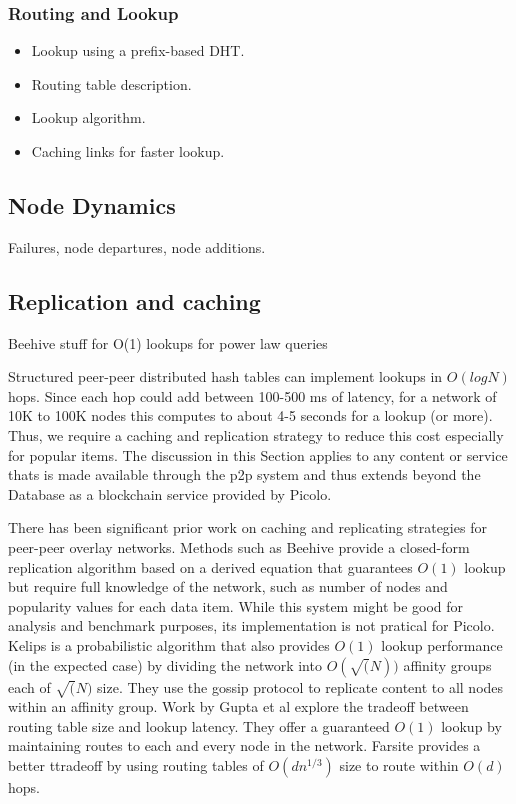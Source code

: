 \subsubsection{Routing and Lookup}

\begin{itemize}
    \item Lookup using a prefix-based DHT. 
    \item Routing table description.
    \item Lookup algorithm.
    \item Caching links for faster lookup. 
\end{itemize}

\subsection{Node Dynamics}

Failures, node departures, node additions.

\subsection{Replication and caching}
Beehive stuff for O(1) lookups for power law queries

Structured peer-peer distributed hash tables can implement lookups in \( O(log N)\) hops. Since each hop could add between 100-500
ms of latency, for a network of 10K to 100K nodes this computes to about 4-5 seconds for a lookup (or more). Thus, we
require a caching and replication strategy to reduce this cost especially for popular items. The discussion in this
Section applies to any content or service thats is made available through the p2p system and thus extends beyond the
Database as a blockchain service provided by Picolo.

There has been significant prior work on caching and replicating strategies for peer-peer overlay networks. Methods such
as Beehive \cite{beehive} provide a closed-form replication algorithm based on a derived equation that guarantees
\(O(1)\) lookup but require full knowledge of the network, such as number of nodes and popularity values for each data
item. While this system might be good for analysis and benchmark purposes, its implementation is not pratical for
Picolo. Kelips \cite{kelips} is a probabilistic algorithm that also provides \(O(1)\) lookup performance (in the
expected case) by dividing the network into \(O(\sqrt(N))\) affinity groups each of \(\sqrt(N)\) size. They use the
gossip protocol to replicate content to all nodes within an affinity group. Work by Gupta et al \cite{one_hop_lookup}
explore the tradeoff between routing table size and lookup latency. They offer a guaranteed \(O(1)\) lookup by
maintaining routes to each and every node in the network. Farsite \cite{farsite} provides a better ttradeoff by using
routing tables of \(O(dn^{1/3})\) size to route within \(O(d)\) hops.

